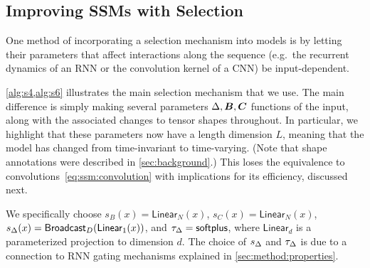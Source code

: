 \subsection{Improving SSMs with Selection}
\label{sec:method:selective}


One method of incorporating a selection mechanism into models is by letting their parameters that affect interactions along the sequence (e.g.\ the recurrent dynamics of an RNN or the convolution kernel of a CNN) be input-dependent.

\cref{alg:s4,alg:s6} illustrates the main selection mechanism that we use. %
The main difference is simply making several parameters $\Delta, \bm{B}, \bm{C}$ functions of the input, %
along with the associated changes to tensor shapes throughout.
In particular, we highlight that these parameters now have a length dimension $L$,
meaning that the model has changed from time-invariant to time-varying.
(Note that shape annotations were described in \cref{sec:background}.)
This loses the equivalence to convolutions~\eqref{eq:ssm:convolution} with implications for its efficiency, discussed next. %

We specifically choose $s_B(x) = \mathsf{Linear}_N(x)$, $s_C(x) = \mathsf{Linear}_N(x)$,
$s_\Delta(x) = \mathsf{Broadcast}_D(\mathsf{Linear}_1(x))$, and $\tau_\Delta = \mathsf{softplus}$,
where $\mathsf{Linear}_d$ is a parameterized projection to dimension $d$.
The choice of $s_\Delta$ and $\tau_\Delta$ is due to a connection to RNN gating mechanisms explained in \cref{sec:method:properties}.


